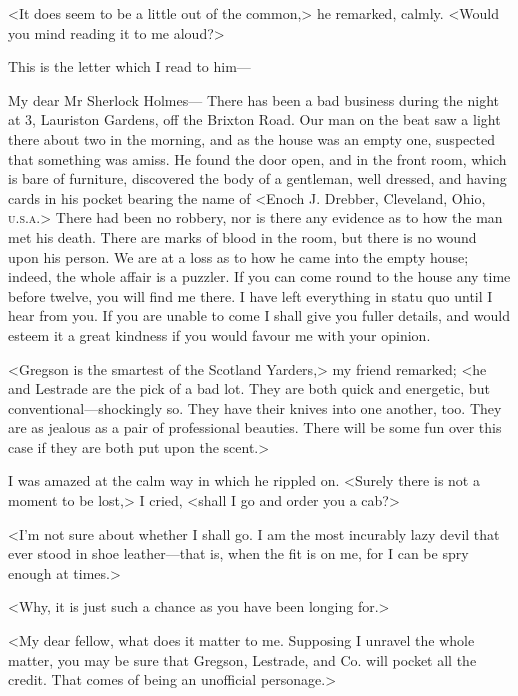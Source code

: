 <It does seem to be a little out of the common,> he remarked, calmly. <Would you mind reading it to me aloud?>

This is the letter which I read to him—

\vspace{-2em}
\begin{mail}{}{My dear Mr Sherlock Holmes—}
\indent There has been a bad business during the night at 3, Lauriston Gardens, off the Brixton Road. Our man on the beat saw a light there about two in the morning, and as the house was an empty one, suspected that something was amiss. He found the door open, and in the front room, which is bare of furniture, discovered the body of a gentleman, well dressed, and having cards in his pocket bearing the name of <Enoch J. Drebber, Cleveland, Ohio, \textsc{u.s.a.}> There had been no robbery, nor is there any evidence as to how the man met his death. There are marks of blood in the room, but there is no wound upon his person. We are at a loss as to how he came into the empty house; indeed, the whole affair is a puzzler. If you can come round to the house any time before twelve, you will find me there. I have left everything in statu quo until I hear from you. If you are unable to come I shall give you fuller details, and would esteem it a great kindness if you would favour me with your opinion.

\end{mail}

<Gregson is the smartest of the Scotland Yarders,> my friend remarked; <he and Lestrade are the pick of a bad lot. They are both quick and energetic, but conventional—shockingly so. They have their knives into one another, too. They are as jealous as a pair of professional beauties. There will be some fun over this case if they are both put upon the scent.>

I was amazed at the calm way in which he rippled on. <Surely there is not a moment to be lost,> I cried, <shall I go and order you a cab?>

<I'm not sure about whether I shall go. I am the most incurably lazy devil that ever stood in shoe leather—that is, when the fit is on me, for I can be spry enough at times.>

<Why, it is just such a chance as you have been longing for.>

<My dear fellow, what does it matter to me. Supposing I unravel the whole matter, you may be sure that Gregson, Lestrade, and Co. will pocket all the credit. That comes of being an unofficial personage.>

